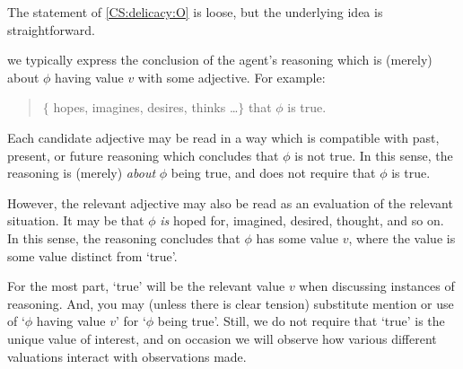 \begin{note}
  The statement of \ref{CS:delicacy:O} is loose, but the underlying idea is straightforward.

  we typically express the conclusion of the agent's reasoning which is (merely) about \(\phi\) having value \(v\) with some adjective.
  For example:

  \begin{quote}
    \vAgent{} \(\{\) hopes, imagines, desires, thinks \dots \(\}\) that \(\phi\) is true.
  \end{quote}
  Each candidate adjective may be read in a way which is compatible with past, present, or future reasoning which concludes that \(\phi\) is not true.
  In this sense, the reasoning is (merely) \emph{about} \(\phi\) being true, and does not require that \(\phi\) is true.

  However, the relevant adjective may also be read as an evaluation of the relevant situation.
  It may be that \(\phi\) \emph{is} hoped for, imagined, desired, thought, and so on.
  In this sense, the reasoning concludes that \(\phi\) has some value \(v\), where the value is some value distinct from `true'.

  For the most part, `true' will be the relevant value \(v\) when discussing instances of reasoning.
  And, you may (unless there is clear tension) substitute mention or use of `\(\phi\) having value \(v\)' for `\(\phi\) being true'.
  Still, we do not require that `true' is the unique value of interest, and on occasion we will observe how various different valuations interact with observations made.
\end{note}

